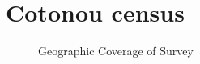 \documentclass[
  11pt,
a4paper
]{article}
\begin{document}
\setcounter{figure}{0}
\renewcommand{\thefigure}{A\arabic{figure}}
\setcounter{table}{0}
\renewcommand{\thetable}{A\arabic{table}}

\hypertarget{survey-census}{%
\section*{Cotonou census}\label{survey-census}}

\begin{figure}[H] \caption{\label{fig:litt} Geographic Coverage of Survey}
\centering
{}
\end{figure}

\singlespacing

\providecommand{\docline}[3]{\noalign{\global\setlength{\arrayrulewidth}{#1}}\arrayrulecolor[HTML]{#2}\cline{#3}}

\setlength{\tabcolsep}{0pt}

\renewcommand*{\arraystretch}{1.5}
\end{document}
